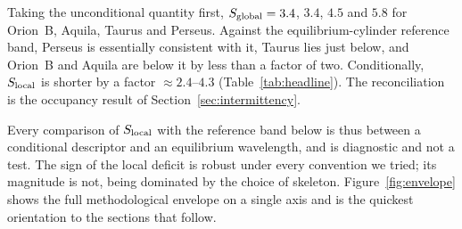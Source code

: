 \documentclass[usenatbib,twoside,twocolumn]{mnras}
\begin{document}
Taking the unconditional quantity first, $S_{\rm global}=3.4$, $3.4$, $4.5$ and $5.8$ for Orion~B, Aquila, Taurus and Perseus. Against the equilibrium-cylinder reference band, Perseus is essentially consistent with it, Taurus lies just below, and Orion~B and Aquila are below it by less than a factor of two. Conditionally, $S_{\rm local}$ is shorter by a factor $\approx2.4$--$4.3$ (Table~\ref{tab:headline}). The reconciliation is the occupancy result of Section~\ref{sec:intermittency}.

Every comparison of $S_{\rm local}$ with the reference band below is thus between a conditional descriptor and an equilibrium wavelength, and is diagnostic  and not a test. The sign of the local deficit is robust under every convention we tried; its magnitude is not, being dominated by the choice of skeleton. Figure~\ref{fig:envelope} shows the full methodological envelope on a single axis and is the quickest orientation to the sections that follow.
\end{document}
